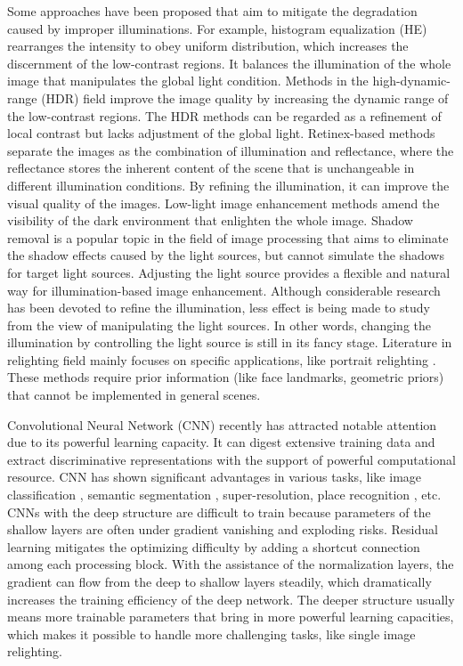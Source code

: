 \documentclass[runningheads]{llncs}
\begin{document}
Some approaches have been proposed that aim to mitigate the degradation caused by improper illuminations. For example, histogram equalization (HE) \cite{HE_1} rearranges the intensity to obey uniform distribution, which increases the discernment of the low-contrast regions. It balances the illumination of the whole image that manipulates the global light condition.  Methods \cite{HDR97,HDR_ECCV} in the high-dynamic-range (HDR) field improve the image quality by increasing the dynamic range of the low-contrast regions. The HDR methods can be regarded as a refinement of local contrast but lacks adjustment of the global light. Retinex-based methods \cite{Retinex2004,RetinexNet} separate the images as the combination of illumination and reflectance, where the reflectance stores the inherent content of the scene that is unchangeable in different illumination conditions. By refining the illumination, it can improve the visual quality of the images.  Low-light image enhancement methods \cite{EnlightenGAN,DLN2020} amend the visibility of the dark environment that enlighten the whole image. Shadow removal \cite{shadow_2018,shadow_2019} is a popular topic in the field of image processing that aims to eliminate the shadow effects caused by the light sources, but cannot simulate the shadows for target light sources. Adjusting the light source provides a flexible and natural way for illumination-based image enhancement. Although considerable research has been devoted to refine the illumination, less effect is being made to study from the view of manipulating the light sources. In other words, changing the illumination by controlling the light source is still in its fancy stage. Literature in relighting field mainly focuses on specific applications, like portrait relighting \cite{Nestmeyer2020LearningPF,Sun2019SingleIP,portrait_relight_2019}. These methods require prior information (like face landmarks, geometric priors) that cannot be implemented in general scenes.

Convolutional Neural Network (CNN) recently has attracted notable attention due to its powerful learning capacity. It can digest extensive training data and extract discriminative representations with the support of powerful computational resource. CNN has shown significant advantages in various tasks, like image classification \cite{imagenet,VGG}, semantic segmentation \cite{seg2015,segYu}, super-resolution\cite{SR19,SR20}, place recognition \cite{ToDayGAN,CNNlocalization}, etc. CNNs with the deep structure are difficult to train because parameters of the shallow layers are often under gradient vanishing and exploding risks.  Residual learning \cite{Resnet2016} mitigates the optimizing difficulty by adding a shortcut connection among each processing block. With the assistance of the normalization layers, the gradient can flow from the deep to shallow layers steadily, which dramatically increases the training efficiency of the deep network. The deeper structure usually means more trainable parameters that bring in more powerful learning capacities, which makes it possible to handle more challenging tasks, like single image relighting.
\end{document}
